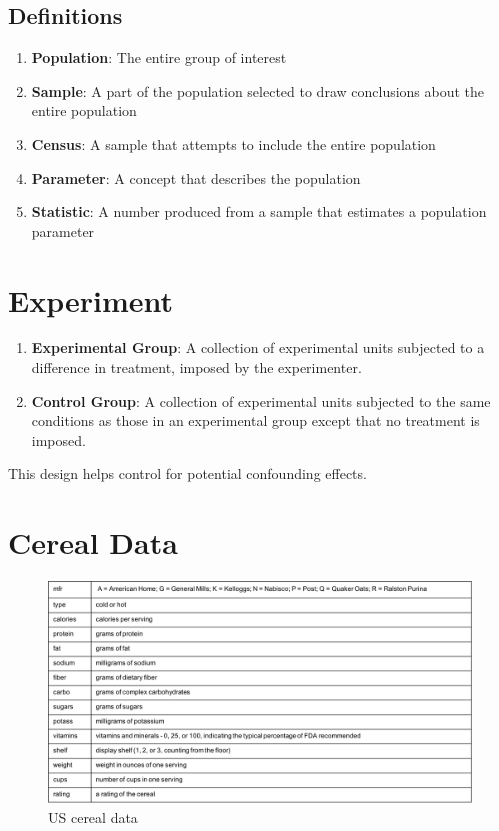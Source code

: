 \documentclass[]{tufte-handout}
\begin{document}
\subsection{Definitions}\label{definitions}

\begin{enumerate}
\def\labelenumi{\arabic{enumi}.}
\item
  \textbf{Population}: The entire group of interest
\item
  \textbf{Sample}: A part of the population selected to draw conclusions
  about the entire population
\item
  \textbf{Census}: A sample that attempts to include the entire
  population
\item
  \textbf{Parameter}: A concept that describes the population
\item
  \textbf{Statistic}: A number produced from a sample that estimates a
  population parameter
\end{enumerate}

\section{Experiment}\label{experiment}

\begin{enumerate}
\def\labelenumi{\arabic{enumi}.}
\item
  \textbf{Experimental Group}: A collection of experimental units
  subjected to a difference in treatment, imposed by the experimenter.
\item
  \textbf{Control Group}: A collection of experimental units subjected
  to the same conditions as those in an experimental group except that
  no treatment is imposed.
\end{enumerate}

This design helps control for potential confounding effects.

\section{Cereal Data}\label{cereal-data}

\begin{figure}
\centering
\includegraphics{UScereal.png}
\caption{US cereal data}
\end{figure}
\end{document}
